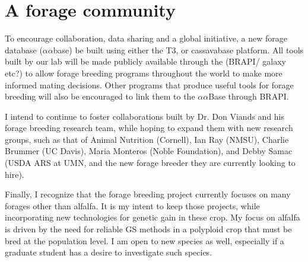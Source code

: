 \documentclass[10pt]{article}
\begin{document}
\section*{A forage community}


To encourage collaboration, data sharing and a global initiative, a new forage database ($\alpha\alpha$base) be built using either the T3, or cassavabase platform. All tools built by our lab will be made publicly available through the (BRAPI/ galaxy etc?) to allow forage breeding programs throughout the world to make more informed mating decisions. Other programs that produce useful tools for forage breeding will also be encouraged to link them to the $\alpha\alpha$Base through BRAPI.


I intend to continue to foster collaborations built by Dr. Don Viands and his forage breeding research team, while hoping to expand them with new research groups, such as that of Animal Nutrition (Cornell), Ian Ray (NMSU), Charlie Brummer (UC Davis), Maria Monteros (Noble Foundation), and Debby Samac (USDA ARS at UMN, and the new forage breeder they are currently looking to hire). 


Finally, I recognize that the forage breeding project currently focuses on many forages other than alfalfa. It is my intent to keep those projects, while incorporating new technologies for genetic gain in these crop. My focus on alfalfa is driven by the need for reliable GS methods in a polyploid crop that must be bred at the population level. I am open to new species as well, especially if a graduate student has a desire to investigate such species.  











\end{document}
